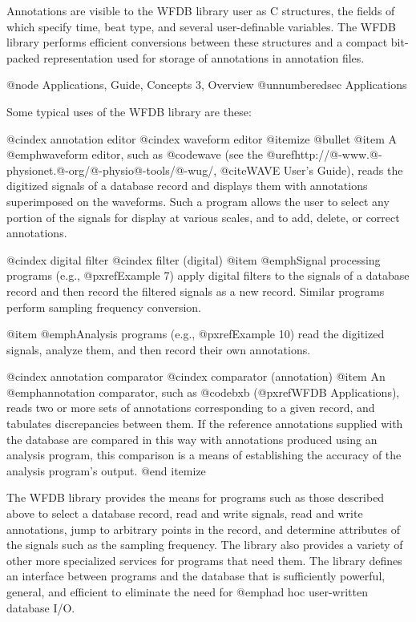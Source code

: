 Annotations are visible to the WFDB library user as C structures, the
fields of which specify time, beat type, and several user-definable
variables.  The WFDB library performs efficient conversions between these
structures and a compact bit-packed representation used for storage of
annotations in annotation files.

@node     Applications, Guide, Concepts 3, Overview
@unnumberedsec Applications

Some typical uses of the WFDB library are these:

@cindex annotation editor
@cindex waveform editor
@itemize @bullet
@item
A @emph{waveform editor}, such as @code{wave} (see the
@uref{http://@-www.@-physionet.@-org/@-physio@-tools/@-wug/,
@cite{WAVE User's Guide}}), reads the
digitized signals of a database record and displays them with
annotations superimposed on the waveforms.  Such a program allows the
user to select any portion of the signals for display at various scales,
and to add, delete, or correct annotations.

@cindex digital filter
@cindex filter (digital)
@item
@emph{Signal processing programs} (e.g., @pxref{Example 7}) apply digital
filters to the signals of a database record and then record the filtered
signals as a new record.  Similar programs perform sampling frequency
conversion.

@item
@emph{Analysis programs} (e.g., @pxref{Example 10}) read the digitized
signals, analyze them, and then record their own annotations.

@cindex annotation comparator
@cindex comparator (annotation)
@item
An @emph{annotation comparator}, such as @code{bxb}
(@pxref{WFDB Applications}), reads two or more sets of annotations
corresponding to a given record, and tabulates discrepancies between
them.  If the reference annotations supplied with the database are
compared in this way with annotations produced using an analysis
program, this comparison is a means of establishing the accuracy of the
analysis program's output.
@end itemize

The WFDB library provides the means for programs such as those described
above to select a database record, read and write signals, read and
write annotations, jump to arbitrary points in the record, and determine
attributes of the signals such as the sampling frequency.  The library
also provides a variety of other more specialized services for programs
that need them.  The library defines an interface between programs and
the database that is sufficiently powerful, general, and efficient to
eliminate the need for @emph{ad hoc} user-written database I/O.


